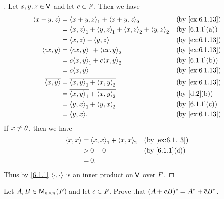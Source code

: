 \begin{proof}[]
	Let \(x, y, z \in \mathsf{V}\) and let \(c \in \mathit{F}\).
	Then we have
	\begin{align*}
		\inn{x + y, z}    & = \inn{x + y, z}_1 + \inn{x + y, z}_2                       &  & \by{ex:6.1.13} \\
		                  & = \inn{x, z}_1 + \inn{y, z}_1 + \inn{x, z}_2 + \inn{y, z}_2 &  & \by{6.1.1}[a]  \\
		                  & = \inn{x, z} + \inn{y, z}                                   &  & \by{ex:6.1.13} \\
		\inn{cx, y}       & = \inn{cx, y}_1 + \inn{cx, y}_2                             &  & \by{ex:6.1.13} \\
		                  & = c \inn{x, y}_1 + c \inn{x, y}_2                           &  & \by{6.1.1}[b]  \\
		                  & = c \inn{x, y}                                              &  & \by{ex:6.1.13} \\
		\conj{\inn{x, y}} & = \conj{\inn{x, y}_1 + \inn{x, y}_2}                        &  & \by{ex:6.1.13} \\
		                  & = \conj{\inn{x, y}_1} + \conj{\inn{x, y}_2}                 &  & \by{d.2}[b]    \\
		                  & = \inn{y, x}_1 + \inn{y, x}_2                               &  & \by{6.1.1}[c]  \\
		                  & = \inn{y, x}.                                               &  & \by{ex:6.1.13}
	\end{align*}
	If \(x \neq \mathit{0}\), then we have
	\begin{align*}
		\inn{x, x} & = \inn{x, x}_1 + \inn{x, x}_2 &  & \by{ex:6.1.13} \\
		           & > 0 + 0                       &  & \by{6.1.1}[d]  \\
		           & = 0.
	\end{align*}
	Thus by \cref{6.1.1} \(\left\langle\cdot, \cdot\right\rangle\) is an inner product on \(\mathsf{V}\) over \(\mathit{F}\).
\end{proof}

\begin{ex}\label{ex:6.1.14}
	Let \(A, B \in \mathsf{M}_{{n} \times n}({\mathit{F}})\) and let \(c \in \mathit{F}\).
	Prove that \((A + cB)^* = A^* + \overline{c} B^*\).
\end{ex}

